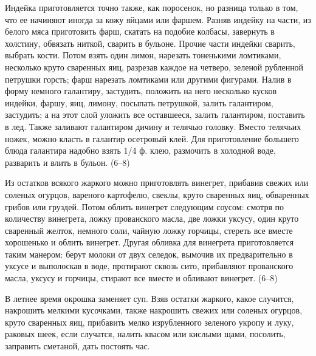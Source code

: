
Индейка приготовляется точно также, как поросенок, но разница только в том, что ее начиняют иногда за кожу яйцами или фаршем. Разняв индейку на части, из белого мяса приготовить фарш, скатать на подобие колбасы, завернуть в холстину, обвязать ниткой, сварить в бульоне. Прочие части индейки сварить, выбрать кости. Потом взять один лимон, нарезать тоненькими ломтиками, несколько круто сваренных яиц, разрезав каждое на четверо, зеленой рубленной петрушки горсть; фарш нарезать ломтиками или другими фигурами. Налив в форму немного галантиру, застудить, положить на него несколько кусков индейки, фаршу, яиц, лимону, посыпать петрушкой, залить галантиром, застудить; а на этот слой уложить все оставшееся, залить галантиром, поставить в лед. Также заливают галантиром дичину и телячью головку. Вместо телячьих ножек, можно класть в галантир осетровый клей. Для приготовление большего блюда галантира надобно взять 1/4 ф. клею, размочить в холодной воде, разварить и влить в бульон. (6–8)


Из остатков всякого жаркого можно приготовлять винегрет, прибавив свежих или соленых огурцов, вареного картофелю, свеклы, круто сваренных яиц, обваренных грибов или груздей. Потом облить винегрет следующим соусом: смотря по количеству винегрета, ложку прованского масла, две ложки уксусу, один круто сваренный желток, немного соли, чайную ложку горчицы, стереть все вместе хорошенько и облить винегрет. Другая обливка для винегрета приготовляется таким манером: берут молоки от двух селедок, вымочив их предварительно в уксусе и выполоскав в воде, протирают сквозь сито, прибавляют прованского масла, уксусу и горчицы, стирают все вместе и обливают винегрет. (6–8)


В летнее время окрошка заменяет суп. Взяв остатки жаркого, какое случится, накрошить мелкими кусочками, также накрошить свежих или соленых огурцов, круто сваренных яиц, прибавить мелко изрубленного зеленого укропу и луку, раковых шеек, если случатся, налить квасом или кислыми щами, посолить, заправить сметаной, дать постоять час.


